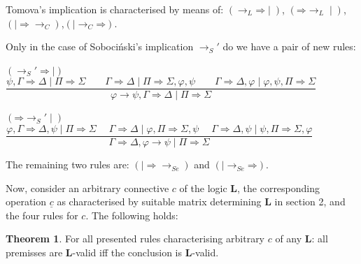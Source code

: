 \documentclass[11pt,a4paper,titlepage]{article}
\theoremstyle{definition}
\newtheorem{theorem}{\textbf{Theorem}}
\newcommand{\3}{\vspace{.3in}}
\newcommand{\2}{\vspace{.2in}}
\newcommand{\1}{\vspace{.1in}}
\newcommand{\5}{\vspace{.05in}}
\begin{document}
Tomova's implication \cite{Heyting} is characterised by means of:
$(\mathord{\rightarrow_L}\mathord{\Rightarrow}\mid)$, $(\mathord{\Rightarrow}\mathord{\rightarrow_L}\mid)$, $(\mathord{\mid\Rightarrow}\mathord{\rightarrow_{C}})$,$(\mathord{\mid \rightarrow_{C}}\mathord{\Rightarrow})$.

Only in the case of Soboci\'nski's implication $\rightarrow_S'$ do we have a pair of new rules:

\begin{flushleft}
	{\footnotesize $(\mathord{\rightarrow_S'}\mathord{\Rightarrow\mid})$ \ $\dfrac{\psi, \Gamma
			\Rightarrow \Delta \mid \Pi\Rightarrow\Sigma \qquad \Gamma\Rightarrow\Delta \mid \Pi \Rightarrow \Sigma, \varphi, \psi \qquad \Gamma\Rightarrow\Delta, \varphi\mid \varphi, \psi, \Pi\Rightarrow\Sigma} {\varphi\rightarrow\psi, \Gamma
			\Rightarrow \Delta \mid \Pi\Rightarrow\Sigma}$}
\end{flushleft}

\begin{flushleft}
	{\footnotesize $(\mathord{\Rightarrow}\mathord{\rightarrow_S'\mid})$ \ $\dfrac{\varphi, \Gamma
			\Rightarrow \Delta, \psi \mid \Pi\Rightarrow\Sigma \;\quad \Gamma\Rightarrow\Delta \mid\varphi,
			\Pi \Rightarrow \Sigma, \psi \;\quad \Gamma\Rightarrow\Delta, \psi \mid \psi, \Pi\Rightarrow\Sigma, \varphi } {\Gamma
			\Rightarrow \Delta, \varphi\rightarrow\psi \mid \Pi\Rightarrow\Sigma}$}
\end{flushleft}


The remaining two rules are: $(\mathord{\mid\Rightarrow}\mathord{\rightarrow_{Se}})$ and $(\mathord{\mid \rightarrow_{Se}}\mathord{\Rightarrow})$.

\1

Now, consider an arbitrary connective $c$ of the logic {\bf L}, the corresponding operation $\underline{c}$ as characterised by suitable matrix determining {\bf L} in section 2, and the four rules for $c$. The following holds:

\begin{theorem} 	
	For all presented rules characterising arbitrary $c$ of any {\bf L}: all premisses are {\bf L}-valid iff the conclusion is {\bf L}-valid.
\end{theorem}
\end{document}

